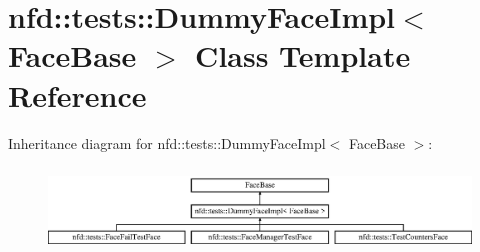 \hypertarget{classnfd_1_1tests_1_1DummyFaceImpl}{}\section{nfd\+:\+:tests\+:\+:Dummy\+Face\+Impl$<$ Face\+Base $>$ Class Template Reference}
\label{classnfd_1_1tests_1_1DummyFaceImpl}
Inheritance diagram for nfd\+:\+:tests\+:\+:Dummy\+Face\+Impl$<$ Face\+Base $>$\+:\begin{figure}[H]
\begin{center}
\leavevmode
\includegraphics[height=2.258065cm]{classnfd_1_1tests_1_1DummyFaceImpl}
\end{center}
\end{figure}
